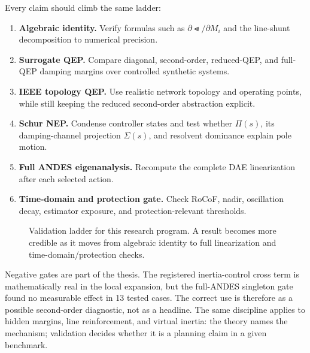 Every claim should climb the same ladder:
\begin{enumerate}
\item \textbf{Algebraic identity.} Verify formulas such as
\(\partial\Lt/\partial M_i\) and the line-shunt decomposition to numerical
precision.
\item \textbf{Surrogate QEP.} Compare diagonal, second-order, reduced-QEP, and
full-QEP damping margins over controlled synthetic systems.
\item \textbf{IEEE topology QEP.} Use realistic network topology and operating
points, while still keeping the reduced second-order abstraction explicit.
\item \textbf{Schur NEP.} Condense controller states and test whether
\(\Pi(s)\), its damping-channel projection \(\Sigma(s)\), and resolvent
dominance explain pole motion.
\item \textbf{Full ANDES eigenanalysis.} Recompute the complete DAE
linearization after each selected action.
\item \textbf{Time-domain and protection gate.} Check RoCoF, nadir,
oscillation decay, estimator exposure, and protection-relevant thresholds.
\end{enumerate}

\begin{figure}[ht]
\centering
{}
\caption{Validation ladder for this research program. A result becomes more
credible as it moves from algebraic identity to full linearization and
time-domain/protection checks.}
\label{fig:validation_ladder_visual}
\end{figure}

Negative gates are part of the thesis. The registered inertia-control cross
term is mathematically real in the local expansion, but the full-ANDES
singleton gate found no measurable effect in 13 tested cases. The correct use
is therefore as a possible second-order diagnostic, not as a headline. The same
discipline applies to hidden margins, line reinforcement, and virtual inertia:
the theory names the mechanism; validation decides whether it is a planning
claim in a given benchmark.
